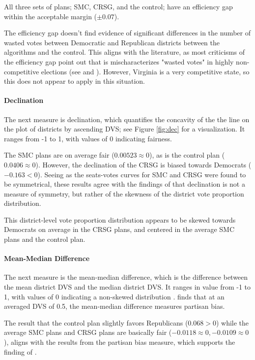 All three sets of plans; SMC, CRSG, and the control; have an efficiency gap within the acceptable margin ($\pm 0.07$). 

The efficiency gap doesn't find evidence of significant differences in the number of wasted votes between Democratic and Republican districts between the algorithms and the control. This aligns with the literature, as most criticisms of the efficiency gap point out that is mischaracterizes "wasted votes" in highly non-competitive elections (see \textcite{veomett2018} and \textcite{katz2020}). However, Virginia is a very competitive state, so this does not appear to apply in this situation.

\paragraph{Declination}

The next measure is declination, which quantifies the concavity of the the line on the plot of districts by ascending DVS; see Figure \ref{fig:dec} for a visualization. It ranges from -1 to 1, with values of 0 indicating fairness. \parencite{warrington2018}

The SMC plans are on average fair ($0.00523 \approx 0$), as is the control plan ($0.0406 \approx 0$). However, the declination of the CRSG is biased towards Democrats ($-0.163 < 0$). Seeing as the seats-votes curves for SMC and CRSG were found to be symmetrical, these results agree with the findings of \textcite{katz2020} that declination is not a measure of symmetry, but rather of the skewness of the district vote proportion distribution. 

This district-level vote proportion distribution appears to be skewed towards Democrats on average in the CRSG plans, and centered in the average SMC plans and the control plan. 

\paragraph{Mean-Median Difference}

The next measure is the mean-median difference, which is the difference between the mean district DVS and the median district DVS. It ranges in value from -1 to 1, with values of 0 indicating a non-skewed distribution \parencite{mcdonald2015}. \textcite{katz2020} finds that at an averaged DVS of 0.5, the mean-median difference measures partisan bias. 

The result that the control plan slightly favors Republicans ($0.068 > 0$) while the average SMC plans and CRSG plans are basically fair ($-0.0118 \approx 0, -0.0109 \approx 0$), aligns with the results from the partisan bias measure, which supports the finding of \textcite{katz2020}. 

